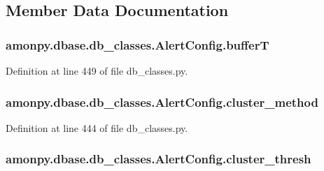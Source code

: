 \subsection{Member Data Documentation}
\hypertarget{classamonpy_1_1dbase_1_1db__classes_1_1_alert_config_af0aff8769055be290414b5bd6364d180}{
\subsubsection[{buffer\-T}]{\setlength{\rightskip}{0pt plus 5cm}amonpy.\-dbase.\-db\-\_\-classes.\-Alert\-Config.\-buffer\-T}}\label{classamonpy_1_1dbase_1_1db__classes_1_1_alert_config_af0aff8769055be290414b5bd6364d180}


Definition at line 449 of file db\-\_\-classes.\-py.

\hypertarget{classamonpy_1_1dbase_1_1db__classes_1_1_alert_config_aeb4dd54c70c114a00192659ba9881a9b}{
\subsubsection[{cluster\-\_\-method}]{\setlength{\rightskip}{0pt plus 5cm}amonpy.\-dbase.\-db\-\_\-classes.\-Alert\-Config.\-cluster\-\_\-method}}\label{classamonpy_1_1dbase_1_1db__classes_1_1_alert_config_aeb4dd54c70c114a00192659ba9881a9b}


Definition at line 444 of file db\-\_\-classes.\-py.

\hypertarget{classamonpy_1_1dbase_1_1db__classes_1_1_alert_config_ac3cf39c10bcacbd6209f3175788168f6}{
\subsubsection[{cluster\-\_\-thresh}]{\setlength{\rightskip}{0pt plus 5cm}amonpy.\-dbase.\-db\-\_\-classes.\-Alert\-Config.\-cluster\-\_\-thresh}}\label{classamonpy_1_1dbase_1_1db__classes_1_1_alert_config_ac3cf39c10bcacbd6209f3175788168f6}


